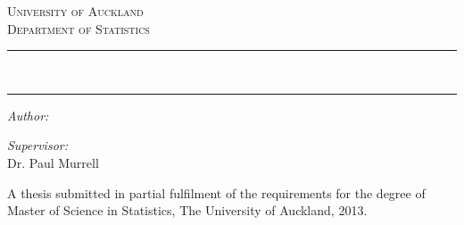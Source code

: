 \begin{titlepage}
\begin{center}
\singlespacing
\vspace*{2.5cm}


\vspace{1cm}

\textsc{\LARGE University of Auckland} \\[0.4cm]
\textsc{\Large Department of Statistics} \\[1cm]

\hrule
\vspace{0.3cm} %
{\Large \doctitle{}} \\[0.2cm]
\hrule
\vspace{1cm}

\begin{minipage}{0.4\textwidth}
\begin{flushleft} \large
\emph{Author:}\\
\docauthor{}
\end{flushleft}
\end{minipage}
\begin{minipage}{0.4\textwidth}
\begin{flushright} \large
\emph{Supervisor:} \\
Dr. Paul Murrell
\end{flushright}
\end{minipage}

\vfill

{\large
A thesis submitted in partial fulfilment of the requirements for the
degree of Master of Science in Statistics, The University of Auckland, 2013.}

\end{center}
\end{titlepage}

\onehalfspacing

